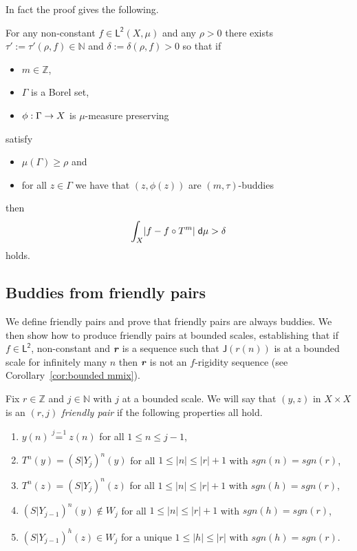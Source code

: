 \documentclass[AHL,Unicode,longabstracts,published]{cedram}
\newcommand{\N}{\mathbb{N}}
\newcommand{\Z}{\mathbb{Z}}
\newcommand{\intd}{\;\mathsf{d}}
\newcommand{\lp}{\mathsf{L}}
\newcommand{\ltwo}{\lp^{\!\mathsf{2}}}
\newcommand{\scl}{\mathsf{J}}
\def\mathbi#1{\textbf{\em #1}}
\newcommand{\bir}{\mathbi{r}}
\let\originalleft\left
\let\originalright\right
\renewcommand{\left}{\mathopen{}\mathclose\bgroup\originalleft}
\renewcommand{\right}{\aftergroup\egroup\originalright}
\renewcommand*{\to}{\mathchoice{\longrightarrow}{\rightarrow}{\rightarrow}{\rightarrow}}
\newcommand*{\relabel}{\renewcommand{\labelenumi}{(\theenumi)}}
\newcommand*{\Fenumi}{\renewcommand*{\theenumi}{F\arabic{enumi}}\relabel}
\begin{document}
In fact the proof gives the following.

\begin{coro}\label{cor:end}
For any non-constant $f \in \ltwo(X,\mu)$ and any $\rho > 0$ there exists $\tau':=\tau'(\rho,f) \in \N$ and $\delta:=\delta(\rho,f)>0$ so that if
\begin{itemize}
\item $m \in \Z$,
\item $\Gamma$ is a Borel set,
\item $\phi:\Gamma \to X$ is $\mu$-measure preserving
\end{itemize}
satisfy
\begin{itemize}
\item $\mu(\Gamma)\geq \rho$ and
\item for all $z \in \Gamma$ we have that $(z,\phi(z))$ are $(m,\tau)$-buddies
\end{itemize}
then
\[
\int_X \left|f -f\circ T^m\right| \intd\mu>\delta
\]
holds.
\end{coro}



\subsection{Buddies from friendly pairs}\label{subsec:buddies from pairs}

We define friendly pairs and prove that friendly pairs are always buddies. We then show how to produce friendly pairs at bounded scales, establishing that if $f\in \ltwo$, non-constant and $\bir$ is a sequence such that $\scl(r(n))$ is at a bounded scale for infinitely many $n$ then $\bir$ is not an $f$-rigidity sequence (see Corollary~\ref{cor:bounded mmix}).

\begin{defi}
\label{def:friends}
Fix $r \in \Z$ and $j \in \N$ with $j$ at a bounded scale. We will say that $(y,z)$ in $X \times X$ is an
\emph{$(r,j)$ friendly pair} if the following properties all hold.
\begin{enumerate}\Fenumi
\item \label{cond:start same}
$y(n) \overset{j-1}{=} z(n)$ for all $1 \le n \le j-1$,
\item \label{cond:T defined 1}
$T^n(y)= (S|Y_j)^n(y)$ for all $1 \le |n| \le |r|+1$ with $sgn(n)=sgn(r)$,
\item \label{cond:T defined 2}
$T^n(z) = (S|Y_j)^n(z)$ for all $1 \le |n| \le |r|+1$ with $sgn(h)=sgn(r)$,
\item \label{cond:friend miss}
$(S|Y_{j-1})^n(y) \not\in W_j$ for all $1 \le |n| \le |r|+1$ with $sgn(h)=sgn(r)$,
\item \label{cond:friend hit}
$(S|Y_{j-1})^h(z) \in W_j$ for a unique $1 \le |h| \le |r|$ with $sgn(h)=sgn(r)$.
\end{enumerate}
\end{defi}
\end{document}
